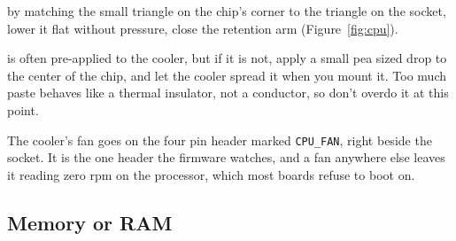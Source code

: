  by matching the small triangle on the chip's corner to the
triangle on the socket, lower it flat without pressure, close the retention arm
(Figure~\ref{fig:cpu}).




 is often pre-applied to the cooler, but if it is not, apply a small pea sized drop to the
    center of the chip, and let the cooler spread it when you mount it.
    Too much paste behaves like a thermal insulator, not a conductor, so don't overdo it at this point.

 The cooler's fan goes on the four
pin header marked \texttt{CPU\_FAN}, right beside the socket. It is the one header
the firmware watches, and a fan anywhere else leaves it reading zero rpm on the
processor, which most boards refuse to boot on.







\subsection{Memory or RAM}


